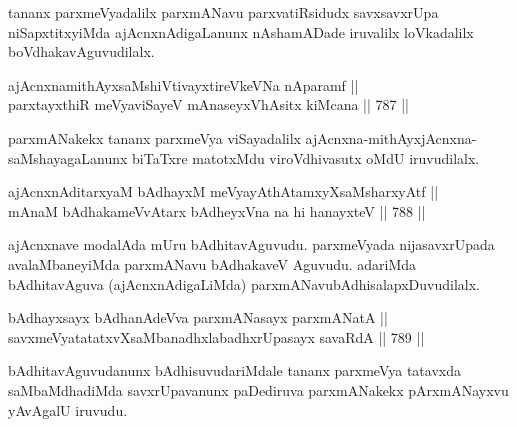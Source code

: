 \begin{artha} 
tananx parxmeVyadalilx parxmANavu parxvatiRsidudx savxsavxrUpa niSapxtitxyiMda ajAcnxnAdigaLanunx nAshamADade iruvalilx loVkadalilx boVdhakavAguvudilalx.
\end{artha}


\begin{shl}
ajAcnxnamithAyxsaMshiVtivayxtireVkeVNa nAparamf || \\
parxtayxthiR meVyaviSayeV mAnaseyxVhAsitx kiMcana \hfill || 787 ||  
\end{shl}

\begin{artha} 
parxmANakekx tananx parxmeVya viSayadalilx ajAcnxna-mithAyxjAcnxna-\break saMshayagaLanunx biTaTxre matotxMdu viroVdhivasutx oMdU iruvudilalx.
\end{artha}


\begin{shl}
ajAcnxnAditarxyaM bAdhayxM meVyayAthAtamxyXsaMsharxyAtf || \\
mAnaM bAdhakameVvAtarx bAdheyxVna na hi hanayxteV \hfill || 788 ||  
\end{shl}

\begin{artha} 
ajAcnxnave modalAda mUru bAdhitavAguvudu. parxmeVyada nijasavxrUpada avalaMbaneyiMda parxmANavu bAdhakaveV Aguvudu. adariMda bAdhitavAguva (ajAcnxnAdigaLiMda) parxmANavu\break bAdhisalapxDuvudilalx.
\end{artha}





\begin{shl}
bAdhayxsayx bAdhanAdeVva parxmANasayx parxmANatA || \\
savxmeVyatatatxvXsaMbanadhxlabadhxrUpasayx savaRdA \hfill || 789 ||  
\end{shl}

\begin{artha}
bAdhitavAguvudanunx bAdhisuvudariMdale tananx parxmeVya tatavxda 
saMbaMdhadiMda savxrUpavanunx paDediruva parxmANakekx pArxmANayxvu yAvAgalU iruvudu.
\end{artha}

